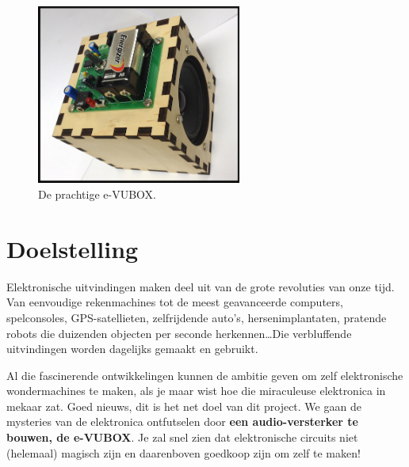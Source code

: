 \documentclass{article}
\begin{document}
	
	\maketitle

	\begin{figure}[htbp]
		\centering
		\includegraphics[width=0.6\textwidth]{foto.jpg}
		\caption{De prachtige e-VUBOX.}
		\label{fig:foto}
	\end{figure}

	\clearpage
	\tableofcontents
	\clearpage

	\section{Doelstelling}
		Elektronische uitvindingen maken deel uit van de grote revoluties van onze tijd. Van eenvoudige rekenmachines tot de meest geavanceerde computers, spelconsoles, GPS-satellieten, zelfrijdende auto's, hersenimplantaten, pratende robots die duizenden objecten per seconde herkennen\ldots Die verbluffende uitvindingen worden dagelijks gemaakt en gebruikt.

		Al die fascinerende ontwikkelingen kunnen de ambitie geven om zelf elektronische wondermachines te maken, als je maar wist hoe die miraculeuse elektronica in mekaar zat. Goed nieuws, dit is het net doel van dit project. We gaan de mysteries van de elektronica ontfutselen door \textbf{een audio-versterker te bouwen, de e-VUBOX}. Je zal snel zien dat elektronische circuits niet (helemaal) magisch zijn en daarenboven goedkoop zijn om zelf te maken!

\end{document}
